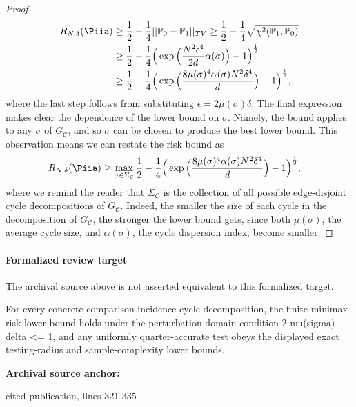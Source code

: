 \documentclass[10pt]{article}
\begin{document}
\begin{ReviewVerbatim}
	\begin{proof}
		\begin{align*}
		R_{N,\delta}(\Piia)
		&\geq \frac{1}{2} - \frac{1}{4}||\mathbb{P}_0 - \mathbb{P}_1||_{TV}
		\geq
		\frac{1}{2} - \frac{1}{4}\sqrt{\chi^2(\mathbb{P}_1,\mathbb{P}_0)} \\
		&\geq \frac{1}{2} - \frac{1}{4}\Big(\exp\Big(\frac{N^2 \epsilon^4}{2d}\alpha(\sigma) \Big) - 1\Big)^{\frac{1}{2}}  \\
		&\geq
		\frac{1}{2} - \frac{1}{4}\Big(\exp\Big(\frac{8\mu(\sigma)^4\alpha(\sigma)N^2 \delta^4}{d} \Big) - 1\Big)^{\frac{1}{2}},
		\end{align*}
		where the last step follows from substituting $\epsilon = 2\mu(\sigma)\delta$. The final expression makes clear the dependence of the lower bound on $\sigma$. Namely, the bound  applies to any $\sigma$ of  $G_\mathcal{C}$, and so $\sigma$ can be chosen to produce the best lower bound. This observation means we can restate the risk bound as
		\begin{align*}
		R_{N,\delta}(\Piia)
		&\geq \max_{\sigma \in \Sigma_{\mathcal{C}}} \frac{1}{2} - \frac{1}{4}\Big(\exp\Big(\frac{8\mu(\sigma)^4\alpha(\sigma)N^2 \delta^4}{d} \Big) - 1\Big)^{\frac{1}{2}},
		\end{align*}
		where we remind the reader that $\Sigma_\mathcal{C}$ is the collection of all possible edge-disjoint cycle decompositions of $G_\mathcal{C}$.
		Indeed, the smaller the size of each cycle in the decomposition of $G_\mathcal{C}$, the stronger the lower bound gets, since both $\mu(\sigma)$, the average cycle size, and $\alpha(\sigma)$, the cycle dispersion index, become smaller.
	\end{proof}
\end{ReviewVerbatim}


\paragraph{Formalized review target}
The archival source above is not asserted equivalent to this formalized target.
\begin{ReviewVerbatim}
For every concrete comparison-incidence cycle decomposition, the finite minimax-risk lower bound holds under the perturbation-domain condition 2 mu(sigma) delta <= 1, and any uniformly quarter-accurate test obeys the displayed exact testing-radius and sample-complexity lower bounds.
\end{ReviewVerbatim}

\textbf{Archival source anchor:} {\footnotesize\raggedright cited publication, lines 321-\allowbreak{}335\par}
\end{document}
